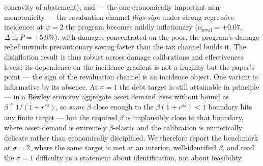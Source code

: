 \documentclass[12pt]{article}
\begin{document}
concavity of abatement), and --- the one economically important
non-monotonicity --- the revaluation channel \emph{flips sign} under strong
regressive incidence: at $\psi=2$ the program becomes mildly inflationary
($\nu_{\mathrm{reval}}=+0.07$, $\Delta\ln P=+5.9\%$): with damages
concentrated on the poor, the program's damage relief unwinds
precautionary saving faster than the tax channel builds it. The
disinflation result is thus robust
across damage calibrations and effectiveness levels; its dependence on
the incidence gradient is not a fragility but the paper's point --- the
sign of the revaluation channel is an incidence object.
One variant is informative by its absence. At $\sigma=1$ the debt target is
still attainable in principle --- in a Bewley economy aggregate asset demand
rises without bound as $\beta\uparrow 1/(1+r^{ss})$, so \emph{some} $\beta$
close enough to the $\beta(1+r^{ss})<1$ boundary hits any finite target ---
but the required $\beta$ is implausibly close to that boundary, where asset
demand is extremely $\beta$-elastic and the calibration is numerically
delicate rather than economically disciplined. We therefore report the
benchmark at $\sigma=2$, where the same target is met at an interior,
well-identified $\beta$, and read the $\sigma=1$ difficulty as a statement
about identification, not about feasibility.
\end{document}
